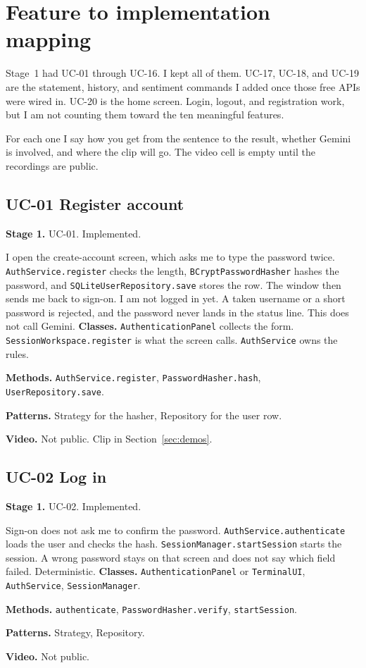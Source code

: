 \documentclass[11pt]{article}
\newcommand{\field}[2]{\textbf{#1.} #2\par}
\begin{document}
\section{Feature to implementation mapping}

Stage~1 had UC-01 through UC-16. I kept all of them. UC-17, UC-18, and UC-19 are the statement, history, and sentiment commands I added once those free APIs were wired in. UC-20 is the home screen. Login, logout, and registration work, but I am not counting them toward the ten meaningful features.

For each one I say how you get from the sentence to the result, whether Gemini is involved, and where the clip will go. The video cell is empty until the recordings are public.

\subsection{UC-01 Register account}
\field{Stage 1}{UC-01. Implemented.}
I open the create-account screen, which asks me to type the password twice. \texttt{AuthService.register} checks the length, \texttt{BCryptPasswordHasher} hashes the password, and \texttt{SQLiteUserRepository.save} stores the row. The window then sends me back to sign-on. I am not logged in yet. A taken username or a short password is rejected, and the password never lands in the status line. This does not call Gemini.
\field{Classes}{\texttt{AuthenticationPanel} collects the form. \texttt{SessionWorkspace.register} is what the screen calls. \texttt{AuthService} owns the rules.}
\field{Methods}{\texttt{AuthService.register}, \texttt{PasswordHasher.hash}, \texttt{UserRepository.save}.}
\field{Patterns}{Strategy for the hasher, Repository for the user row.}
\field{Video}{Not public. Clip in Section~\ref{sec:demos}.}

\subsection{UC-02 Log in}
\field{Stage 1}{UC-02. Implemented.}
Sign-on does not ask me to confirm the password. \texttt{AuthService.authenticate} loads the user and checks the hash. \texttt{SessionManager.startSession} starts the session. A wrong password stays on that screen and does not say which field failed. Deterministic.
\field{Classes}{\texttt{AuthenticationPanel} or \texttt{TerminalUI}, \texttt{AuthService}, \texttt{SessionManager}.}
\field{Methods}{\texttt{authenticate}, \texttt{PasswordHasher.verify}, \texttt{startSession}.}
\field{Patterns}{Strategy, Repository.}
\field{Video}{Not public.}
\end{document}
